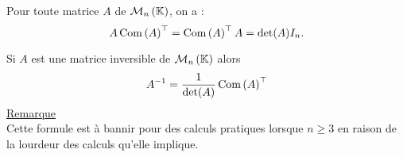 \begin{defprop}
    Pour toute matrice \(A\) de \(\M{n}\), on a :
    \[A \operatorname{Com}\left(A\right)^{\top} = \operatorname{Com}\left(A\right)^{\top} A = \det (A)I_n.\]
\end{defprop}
\begin{defprop}
    Si \(A\) est une matrice inversible de \(\M{n}\) alors
    \[A^{-1} = \frac{1}{\det (A)} \operatorname{Com}\left(A\right)^{\top} \]
    \underline{Remarque}\\
    Cette formule est à bannir pour des calculs pratiques lorsque \(n \geq 3\) en raison de la lourdeur des calculs qu’elle implique.
\end{defprop}